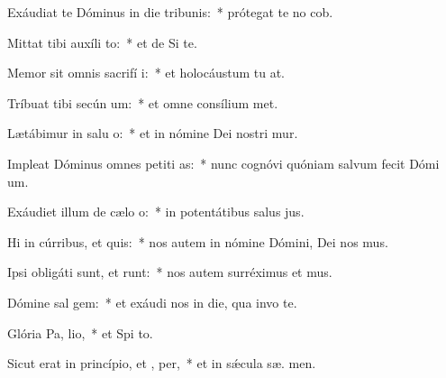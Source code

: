 \item Exáudiat te Dóminus in die tribunis:~* prótegat te no  cob.
\item Mittat tibi auxíli  to:~* et de Si  te.
\item Memor sit omnis sacrifí i:~* et holocáustum tu  at.
\item Tríbuat tibi secún  um:~* et omne consílium  met.
\item Lætábimur in salu o:~* et in nómine Dei nostri mur.
\item Impleat Dóminus omnes petiti as:~* nunc cognóvi quóniam salvum fecit Dómi  um.
\item Exáudiet illum de cælo  o:~* in potentátibus salus  jus.
\item Hi in cúrribus, et   quis:~* nos autem in nómine Dómini, Dei nos mus.
\item Ipsi obligáti sunt, et runt:~* nos autem surréximus et  mus.
\item Dómine sal  gem:~* et exáudi nos in die, qua invo te.
\item Glória Pa,  lio,~* et Spi to.
\item Sicut erat in princípio, et ,  per,~* et in sǽcula sæ. men.
